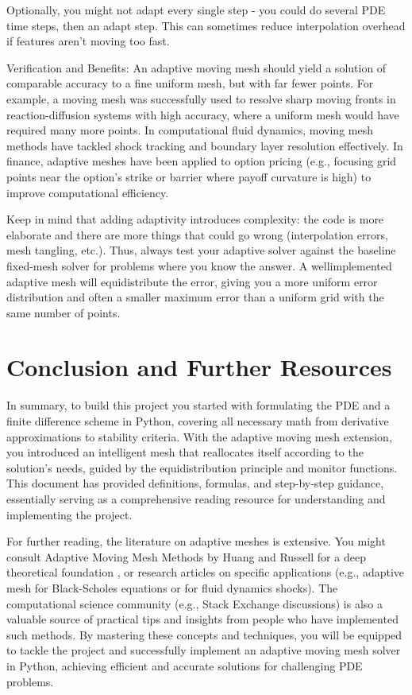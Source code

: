 \documentclass{adonis}
\begin{document}
Optionally, you might not adapt every single step - you could do several PDE time steps, then an adapt step. This can sometimes reduce interpolation overhead if features aren’t moving too fast.

Verification and Benefits: An adaptive moving mesh should yield a solution of comparable accuracy to a fine uniform mesh, but with far fewer points. For example, a moving mesh was successfully used to resolve sharp moving fronts in reaction-diffusion systems with high accuracy, where a uniform mesh would have required many more points. In computational fluid dynamics, moving mesh methods have tackled shock tracking and boundary layer resolution effectively. In finance, adaptive meshes have been applied to option pricing (e.g., focusing grid points near the option’s strike or barrier where payoff curvature is high) to improve computational efficiency. 

Keep in mind that adding adaptivity introduces complexity: the code is more elaborate and there are more things that could go wrong (interpolation errors, mesh tangling, etc.). Thus, always test your adaptive solver against the baseline fixed-mesh solver for problems where you know the answer. A wellimplemented adaptive mesh will equidistribute the error, giving you a more uniform error distribution and often a smaller maximum error than a uniform grid with the same number of points.

\section{Conclusion and Further Resources}

In summary, to build this project you started with formulating the PDE and a finite difference scheme in Python, covering all necessary math from derivative approximations to stability criteria. With the adaptive moving mesh extension, you introduced an intelligent mesh that reallocates itself according to the solution's needs, guided by the equidistribution principle and monitor functions. This document has provided definitions, formulas, and step-by-step guidance, essentially serving as a comprehensive reading resource for understanding and implementing the project.

For further reading, the literature on adaptive meshes is extensive. You might consult Adaptive Moving Mesh Methods by Huang and Russell for a deep theoretical foundation , or research articles on specific applications (e.g., adaptive mesh for Black-Scholes equations or for fluid dynamics shocks). The computational science community (e.g., Stack Exchange discussions) is also a valuable source of practical tips and insights from people who have implemented such methods. By mastering these concepts and techniques, you will be equipped to tackle the project and successfully implement an adaptive moving mesh solver in Python, achieving efficient and accurate solutions for challenging PDE problems. 
\end{document}
